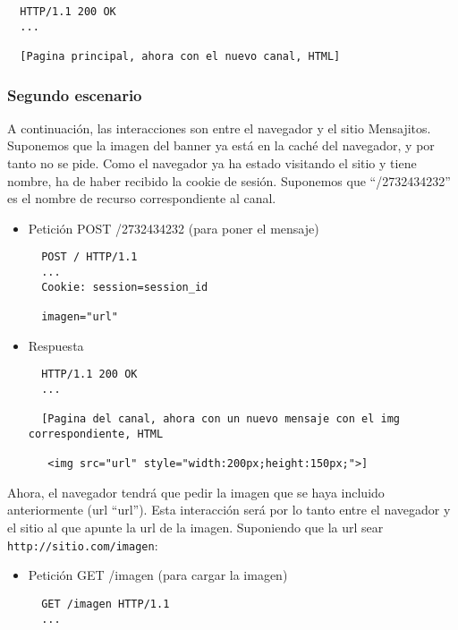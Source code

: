 {\begin{itemize}
\begin{verbatim}
  HTTP/1.1 200 OK
  ...

  [Pagina principal, ahora con el nuevo canal, HTML]
\end{verbatim}

\end{itemize}

\subsubsection*{Segundo escenario}

A continuación, las interacciones son entre el navegador y el sitio Mensajitos. Suponemos que la imagen del banner ya está en la caché del navegador, y por tanto no se pide. Como el navegador ya ha estado visitando el sitio y tiene nombre, ha de haber recibido la cookie de sesión. Suponemos que ``/2732434232'' es el nombre de recurso correspondiente al canal.

\begin{itemize}
\item Petición POST /2732434232 (para poner el mensaje)

\begin{verbatim}
  POST / HTTP/1.1
  ...
  Cookie: session=session_id

  imagen="url"
\end{verbatim}

\item Respuesta

\begin{verbatim}
  HTTP/1.1 200 OK
  ...

  [Pagina del canal, ahora con un nuevo mensaje con el img correspondiente, HTML
   
   <img src="url" style="width:200px;height:150px;">]
\end{verbatim}

\end{itemize}

Ahora, el navegador tendrá que pedir la imagen que se haya incluido anteriormente (url ``url''). Esta interacción será por lo tanto entre el navegador y el sitio al que apunte la url de la imagen. Suponiendo que la url sear \verb|http://sitio.com/imagen|:

\begin{itemize}
\item Petición GET /imagen (para cargar la imagen)

\begin{verbatim}
  GET /imagen HTTP/1.1
  ...
\end{verbatim}


\end{itemize}}
